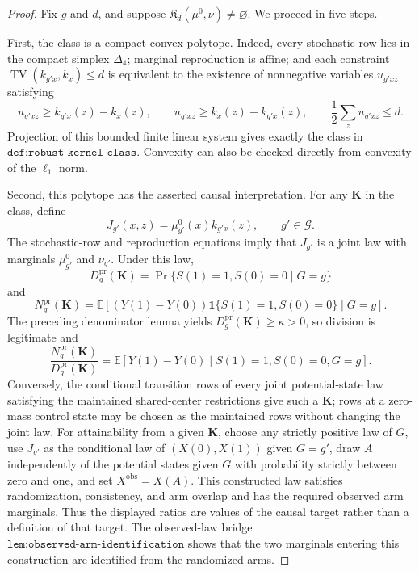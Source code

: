 \documentclass{article}
\begin{document}
\begin{proof}
Fix \(g\) and \(d\), and suppose \(\mathfrak K_d(\mu^0,\nu)\ne\varnothing\).  We proceed in five steps.

First, the class is a compact convex polytope.  Indeed, every stochastic row lies in the compact simplex \(\Delta_4\); marginal reproduction is affine; and each constraint
\(\operatorname{TV}(k_{g'x},k_x)\le d\) is equivalent to the existence of nonnegative variables \(u_{g'xz}\) satisfying
\[
 u_{g'xz}\ge k_{g'x}(z)-k_x(z),\qquad
 u_{g'xz}\ge k_x(z)-k_{g'x}(z),\qquad
 \frac12\sum_z u_{g'xz}\le d.
\]
Projection of this bounded finite linear system gives exactly the class in \(\texttt{def:robust-kernel-class}\).  Convexity can also be checked directly from convexity of the \(\ell_1\) norm.

Second, this polytope has the asserted causal interpretation.  For any \(\mathbf K\) in the class, define
\[
 J_{g'}(x,z)=\mu_{g'}^0(x)k_{g'x}(z),\qquad g'\in\mathcal G.
\]
The stochastic-row and reproduction equations imply that \(J_{g'}\) is a joint law with marginals \(\mu_{g'}^0\) and \(\nu_{g'}\).  Under this law,
\[
 D_g^{\mathrm{pr}}(\mathbf K)
 =\Pr\{S(1)=1,S(0)=0\mid G=g\}
\]
and
\[
 N_g^{\mathrm{pr}}(\mathbf K)
 =\mathbb E[(Y(1)-Y(0))\mathbf 1\{S(1)=1,S(0)=0\}\mid G=g].
\]
The preceding denominator lemma yields \(D_g^{\mathrm{pr}}(\mathbf K)\ge\kappa>0\), so division is legitimate and
\[
 \frac{N_g^{\mathrm{pr}}(\mathbf K)}{D_g^{\mathrm{pr}}(\mathbf K)}
 =\mathbb E[Y(1)-Y(0)\mid S(1)=1,S(0)=0,G=g].
\]
Conversely, the conditional transition rows of every joint potential-state law satisfying the maintained shared-center restrictions give such a \(\mathbf K\); rows at a zero-mass control state may be chosen as the maintained rows without changing the joint law.  For attainability from a given \(\mathbf K\), choose any strictly positive law of \(G\), use \(J_{g'}\) as the conditional law of \((X(0),X(1))\) given \(G=g'\), draw \(A\) independently of the potential states given \(G\) with probability strictly between zero and one, and set \(X^{\mathrm{obs}}=X(A)\).  This constructed law satisfies randomization, consistency, and arm overlap and has the required observed arm marginals.  Thus the displayed ratios are values of the causal target rather than a definition of that target.  The observed-law bridge \(\texttt{lem:observed-arm-identification}\) shows that the two marginals entering this construction are identified from the randomized arms.


\end{proof}
\end{document}
